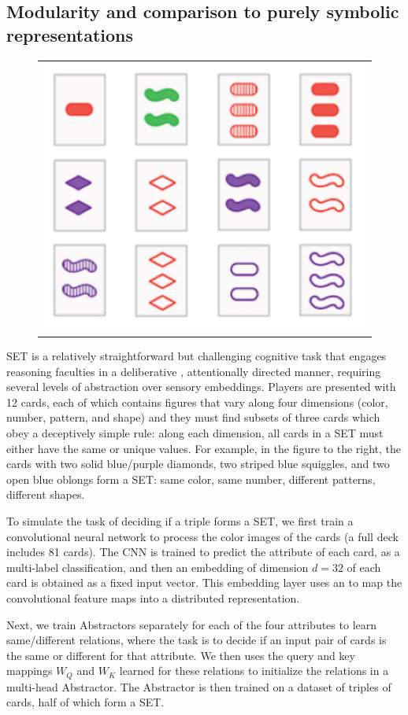 \subsection{Modularity and comparison to purely symbolic representations}
\label{ssec:set_exp}


\begin{figure}
	\begin{tabular}{c}
		\includegraphics[width=.30\textwidth]{figures/set_example}\\
	\end{tabular}
\end{figure}
SET is a relatively straightforward but challenging cognitive task that engages reasoning faculties in a deliberative
, attentionally directed manner, requiring several levels of abstraction over sensory embeddings. Players are
presented with 12 cards, each of which contains figures that vary along four dimensions (color, number, pattern, and
shape) and they must find subsets of three cards which obey a deceptively simple rule: along each dimension, all cards in a SET must either have the same or unique values. For example, in the figure to the right, the cards with two solid blue/purple diamonds, two striped blue squiggles, and two open blue oblongs form a SET: same color, same number, different patterns, different shapes.

To simulate the task of deciding if a triple forms a SET, we first train a convolutional neural network to process the color images of the cards (a full deck includes 81 cards). The CNN is trained to predict the attribute of
each card, as a multi-label classification, and then an embedding of dimension $d=32$ of 
each card is obtained as a fixed input vector. This embedding layer uses an \MLP{} to map the convolutional feature maps into a distributed representation.

Next, we train Abstractors separately for each of the four attributes to learn same/different 
relations, where the task is to decide if an input pair of cards is the same or different for that attribute. 
We then uses the query and key mappings $W_Q$ and $W_K$ learned for these relations to initialize the relations
in a multi-head Abstractor. The Abstractor is then trained on a dataset of triples of cards, half of which form a SET. 

